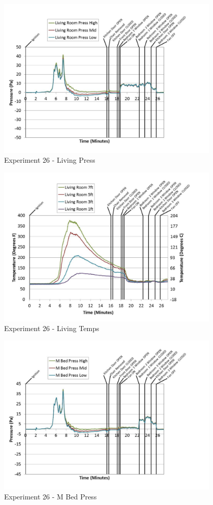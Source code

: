 \documentclass{article}
\begin{document}
\begin{appendices}
	\clearpage

	\begin{figure}[h!]
		\centering
		\includegraphics[height=3.05in]{0_Images/Results_Charts/Exp_26_Charts/LivingPress.pdf}
		\caption{Experiment 26 - Living Press}
	\end{figure}
 

	\begin{figure}[h!]
		\centering
		\includegraphics[height=3.05in]{0_Images/Results_Charts/Exp_26_Charts/LivingTemps.pdf}
		\caption{Experiment 26 - Living Temps}
	\end{figure}
 
	\clearpage

	\begin{figure}[h!]
		\centering
		\includegraphics[height=3.05in]{0_Images/Results_Charts/Exp_26_Charts/MBedPress.pdf}
		\caption{Experiment 26 - M Bed Press}
	\end{figure}
 


\end{appendices}
\end{document}
